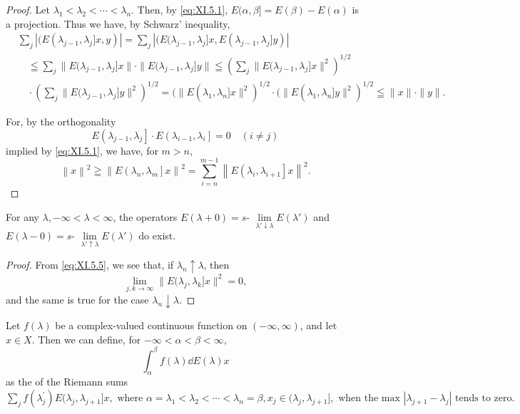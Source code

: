 \begin{proof}
 Let $\lambda_1 < \lambda_2 < \cdots < \lambda_n$. Then, by \eqref{eq:XI.5.1}, $E(\alpha, \beta] = E(\beta) - E(\alpha)$ is a projection. Thus we have, by Schwarz' inequality, 
\[
\begin{aligned}
&\sum\limits_{j} | (E (\lambda_{j-1}, \lambda_{j} ] x, y) | = \sum\limits_{j} | (E (\lambda_{j-1}, \lambda_{j} ] x, E (\lambda_{j-1}, \lambda_{j} ] y) |
\\
&\quad \leqq \sum\limits_{j} \| E (\lambda_{j-1}, \lambda_{j} ] x \| \cdot \| E (\lambda_{j-1}, \lambda_{j} ] y \| \leqq \left(\sum\limits_{j} \| E (\lambda_{j-1}, \lambda_{j} ] x \| ^{2}\right) ^{1/2}
\\
&\quad \cdot \left(\sum\limits_{j} \| E (\lambda_{j-1}, \lambda_{j} ] y \| ^{2}\right) ^{1/2} = (\| E (\lambda_{1}, \lambda_{n} ] x \| ^{2}) ^{1/2} \cdot (\| E (\lambda_{1}, \lambda_{n} ] y \| ^{2}) ^{1/2} \leqq \| x \| \cdot \| y \|.
\end{aligned}
\]

For, by the orthogonality 
\begin{equation}\label{eq:XI.5.4}
E \left(\lambda_{j-1}, \lambda_{j} \right] \cdot E \left(\lambda_{i-1}, \lambda_{i} \right] = 0 \quad (i \neq j)
\end{equation}
implied by \eqref{eq:XI.5.1}, we have, for $m > n$, 
\begin{equation}\label{eq:XI.5.5}
\left\| x \right\| ^{2} \geqq \left\| E \left(\lambda_{n}, \lambda_{m} \right] x \right\| ^{2} = \sum\limits_{i=n} ^{m-1} \left\| E \left(\lambda_{i}, \lambda_{i+1} \right] x \right\| ^{2}.
\end{equation}
\end{proof}

\begin{corollaryu} For any $\lambda, -\infty < \lambda < \infty$, the operators $E(\lambda + 0) = s\text{- }\lim\limits_{\lambda' \downarrow \lambda} E(\lambda')$ and $E(\lambda - 0) = s\text{- }\lim\limits_{\lambda' \uparrow \lambda} E(\lambda')$ do exist. 
\end{corollaryu}

\begin{proof}
 From \eqref{eq:XI.5.5}, we see that, if $\lambda_{n} \uparrow \lambda$, then 
\[
\lim\limits _{j, k \rightarrow \infty} \| E (\lambda_{j}, \lambda_{k} ] x \| ^{2} = 0,
\]
and the same is true for the case $\lambda_{n} \downarrow \lambda$. 
\end{proof}

\begin{proposition}\label{prop:XI.5.Proposition.2} Let $f(\lambda)$ be a complex-valued continuous function on $(-\infty, \infty)$, and let $x \in X$. Then we can define, for $-\infty < \alpha < \beta < \infty$, 
\[
\int_{\alpha} ^{\beta} f (\lambda) \dd E (\lambda) x
\]
as the \slim of the Riemann sums 
$\sum\limits_{j}f(\lambda_{j}^{\prime})E(\lambda_{j},\lambda_{j+1}]x,\text{ where }\alpha=\lambda_{1}<\lambda_{2}<\cdots<\lambda_{n}=\beta,x_{j}\in(\lambda_{j},\lambda_{j+1}],\text{ when the max }|\lambda_{j+1}-\lambda_{j}| \text{ tends to zero. }$ 
\end{proposition}

